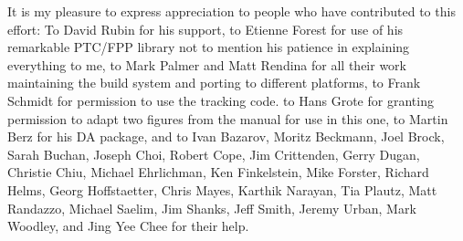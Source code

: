 It is my pleasure to express appreciation to people who have
contributed to this effort: To David Rubin for his support, to Etienne
Forest for use of his remarkable PTC/FPP library not to mention his
patience in explaining everything to me, to Mark Palmer and Matt
Rendina for all their work maintaining the build system and porting
\bmad to different platforms, to Frank Schmidt for permission to use
the \mad tracking code. to Hans Grote for granting permission to adapt
two figures from the \mad manual for use in this one, to Martin Berz
for his DA package, and to Ivan Bazarov, Moritz Beckmann, Joel Brock,
Sarah Buchan, Joseph Choi, Robert Cope, Jim Crittenden, Gerry Dugan,
Christie Chiu, Michael Ehrlichman, Ken Finkelstein, Mike Forster,
Richard Helms, Georg Hoffstaetter, Chris Mayes, Karthik Narayan, Tia
Plautz, Matt Randazzo, Michael Saelim, Jim Shanks, Jeff Smith, Jeremy
Urban, Mark Woodley, and Jing Yee Chee for their help.

